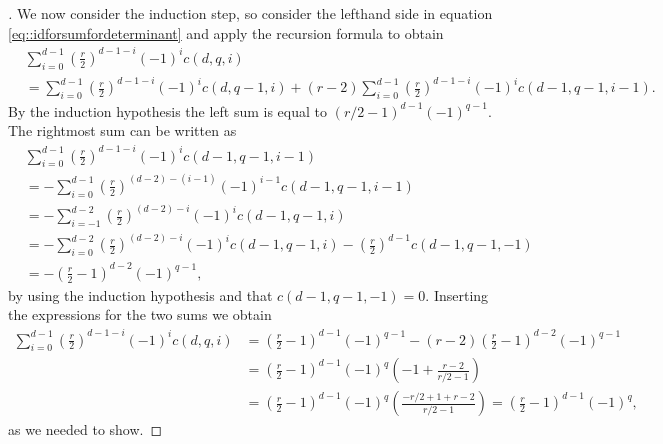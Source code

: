 \documentclass[10pt,a4paper]{amsart}
\begin{document}
\begin{proof}[]

We now consider the induction step, so consider the lefthand side in equation \eqref{eq::idforsumfordeterminant} and apply the recursion formula to obtain
\begin{align*}
    &\sum_{i = 0}^{d-1} \left(\frac{r}{2} \right)^{d-1-i} (-1)^{i} c(d,q,i) \\ &= 
    \sum_{i = 0}^{d-1} \left(\frac{r}{2} \right)^{d-1-i} (-1)^{i} c(d,q-1,i) +
    (r-2)\sum_{i = 0}^{d-1} \left(\frac{r}{2} \right)^{d-1-i} (-1)^{i} c(d-1,q-1,i-1).  
\end{align*}
By the induction hypothesis the left sum is equal to $\left( r/2 - 1 \right)^{d-1} (-1)^{q-1}$. The rightmost sum can be written as
\begin{align*}
    &\sum_{i = 0}^{d-1} \left(\frac{r}{2} \right)^{d-1-i} (-1)^{i} c(d-1,q-1,i-1) \\ &= - \sum_{i = 0}^{d-1} \left(\frac{r}{2} \right)^{(d-2)-(i-1)} (-1)^{i-1} c(d-1,q-1,i-1) \\
    &= - \sum_{i = -1}^{d-2} \left(\frac{r}{2} \right)^{(d-2)-i} (-1)^{i} c(d-1,q-1,i) \\
    &= - \sum_{i = 0}^{d-2} \left(\frac{r}{2} \right)^{(d-2)-i} (-1)^{i} c(d-1,q-1,i) 
    - \left(\frac{r}{2} \right)^{d-1} c(d-1, q-1, -1) \\
    &= - \left(\frac{r}{2} -1 \right)^{d-2} (-1)^{q-1},
\end{align*}
by using the induction hypothesis and that $c(d-1, q-1, -1) = 0$. Inserting the expressions for the two sums we obtain
\begin{align*}
    \sum_{i = 0}^{d-1} \left(\frac{r}{2} \right)^{d-1-i} (-1)^{i} c(d,q,i) &= \left(\frac{r}{2} -1 \right)^{d-1} (-1)^{q-1} - (r-2)\left(\frac{r}{2} -1 \right)^{d-2} (-1)^{q-1} \\
    &=  \left(\frac{r}{2} -1 \right)^{d-1} (-1)^{q} \left( -1 + \frac{r-2}{r/2-1} \right) \\
    &=  \left(\frac{r}{2} -1 \right)^{d-1} (-1)^{q} \left(\frac{-r/2 + 1 + r-2}{r/2-1} \right) = 
    \left(\frac{r}{2} -1 \right)^{d-1} (-1)^{q},
\end{align*}
as we needed to show. 
\end{proof}
\end{document}
